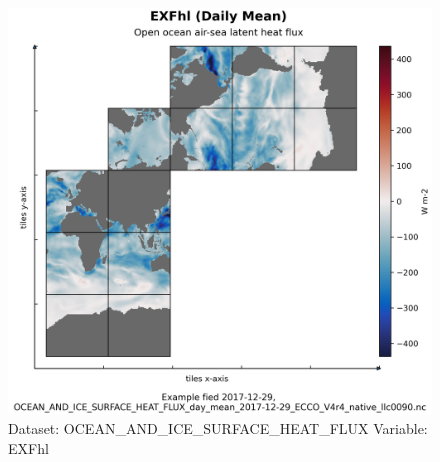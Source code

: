 \begin{figure}[H]
\centering
\includegraphics[width=\textwidth]{../images/plots/native_plots/Ocean_and_Sea-Ice_Surface_Heat_Fluxes/EXFhl.png}
\caption{Dataset: OCEAN\_AND\_ICE\_SURFACE\_HEAT\_FLUX Variable: EXFhl}
\label{tab:table-OCEAN_AND_ICE_SURFACE_HEAT_FLUX_EXFhl-Plot}
\end{figure}
\pagebreak
